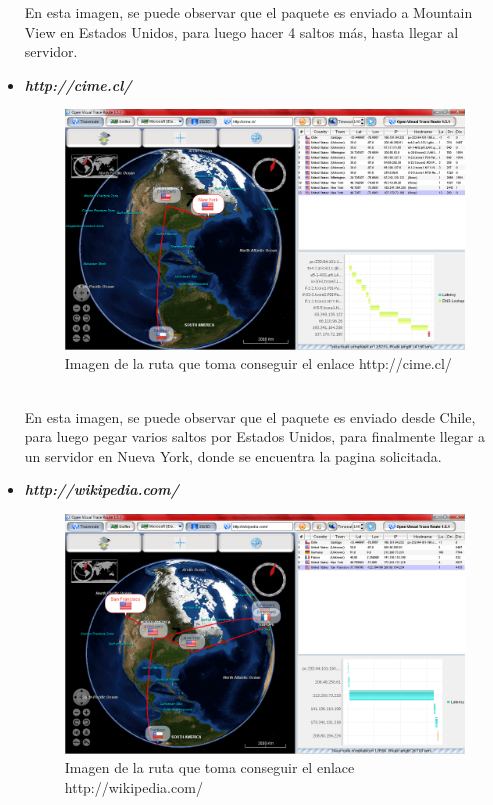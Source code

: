 \documentclass[a4paper,10pt]{article}
\begin{document}
\begin{itemize}
En esta imagen, se puede observar que el paquete es enviado a Mountain View en Estados Unidos, para luego hacer 4 saltos más, hasta llegar al servidor.\\

 \item  \textbf{\textsl{http://cime.cl/}}\\



\begin{figure}[H]
\centering
\includegraphics[height=8 cm]{imagenes/enlace3.png}
\caption{Imagen de la ruta que toma conseguir el enlace http://cime.cl/ }
\end{figure} \\ 

En esta imagen, se puede observar que el paquete es enviado desde Chile, para luego pegar varios saltos por Estados Unidos, para finalmente llegar a un servidor en Nueva York, donde se encuentra la pagina solicitada.\\

 \item  \textbf{\textsl{http://wikipedia.com/}}\\



\begin{figure}[H]
\centering
\includegraphics[height=8 cm]{imagenes/enlace4.png}
\caption{Imagen de la ruta que toma conseguir el enlace http://wikipedia.com/ }
\end{figure} \\ 


\end{itemize}
\end{document}
